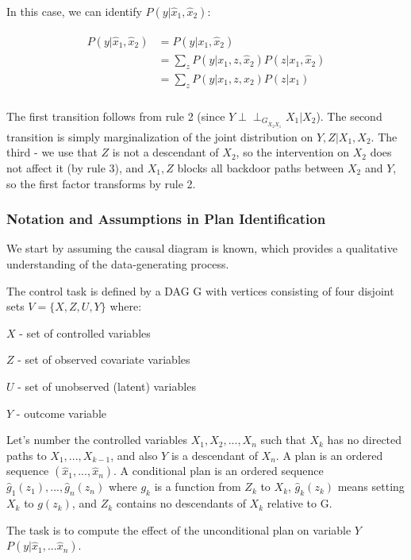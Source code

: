 \documentclass[fleqn]{article}
\newcommand{\independent}{\perp \!\!\! \perp}
\numberwithin{equation}{section}
\numberwithin{theorem}{section}
\numberwithin{figure}{section}
\numberwithin{lemma}{section}
\numberwithin{corollary}{section}
\begin{document}
In this case, we can identify $P(y | \hat x_1, \hat x_2)$:

\begin{align}
	\begin{split}
		P(y | \hat x_1, \hat x_2) &= P(y|x_1, \hat x_2) \\
		&= \sum\limits_{z} P(y|x_1,z, \hat x_2)P(z|x_1,\hat x_2)\\
		&= \sum\limits_{z} P(y|x_1,z, x_2)P(z|x_1)\\
	\end{split}
\end{align}

The first transition follows from rule 2 (since $Y \independent_{G_{\overline X_2 \underline{X_1}}} X_1 | X_2$). The second transition is simply marginalization of the joint distribution on $Y,Z | X_1, X_2$. The third - we use that $Z$ is not a descendant of $X_2$, so the intervention on $X_2$ does not affect it (by rule 3), and $X_1, Z$ blocks all backdoor paths between $X_2$ and $Y$, so the first factor transforms by rule 2.

\subsubsection*{Notation and Assumptions in Plan Identification}

We start by assuming the causal diagram is known, which provides a qualitative understanding of the data-generating process.

The control task is defined by a DAG G with vertices consisting of four disjoint sets $V = \{X,Z,U,Y\}$ where:

$X$ - set of controlled variables

$Z$ - set of observed covariate variables

$U$ - set of unobserved (latent) variables

$Y$ - outcome variable

Let's number the controlled variables $X_1,X_2,...,X_n$ such that $X_k$ has no directed paths to $X_1,...,X_{k-1}$, and also $Y$ is a descendant of $X_n$. A plan is an ordered sequence $(\hat x_1, ..., \hat x_n)$. A conditional plan is an ordered sequence $\hat g_1(z_1), ..., \hat g_n(z_n)$ where $g_k$ is a function from $Z_k$ to $X_k$, $\hat g_k(z_k)$ means setting $X_k$ to $g(z_k)$, and $Z_k$ contains no descendants of $X_k$ relative to G.

The task is to compute the effect of the unconditional plan on variable $Y$ $P(y|\hat x_1, ...\hat x_n)$.
\end{document}
